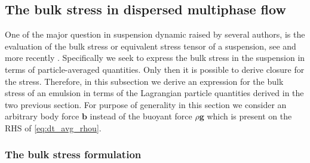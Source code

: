 

\subsection{The bulk stress in dispersed multiphase flow}



One of the major question in suspension dynamic raised by several authors, is the evaluation of the bulk stress or equivalent stress tensor of a suspension, see \citep{prosperetti2006stress, batchelor1970stress,zhang1997momentum,nadim1996concise} and more recently \citet{dolata2020heterogeneous}. 
Specifically we seek to express the bulk stress in the suspension in terms of particle-averaged quantities. 
Only then it is possible to derive closure for the stress. 
Therefore, in this subsection we derive an expression for the bulk stress of an emulsion in terms of the Lagrangian particle quantities derived in the two previous section. 
For purpose of generality in this section we consider an arbitrary body force $\textbf{b}$ instead of  the buoyant force $\rho \textbf{g}$ which is present on the RHS of \ref{eq:dt_avg_rhou}. 

\subsubsection{The bulk stress formulation}

